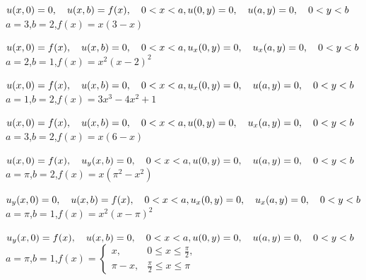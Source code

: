 \begin{exerciselist}

  \item\label{exer:12.3.17} \Cex $u(x,0)=0,\quad u(x,b)=f(x),\quad0<x<a,\\ u(0,y)=0,\quad u(a,y)=0,\quad0<y<b$ \\ $a=3$,\quad $b=2$,\quad $f(x)=x(3-x)$

  \item\label{exer:12.3.18} $u(x,0)=f(x),\quad u(x,b)=0,\quad0<x<a,\\ u_{x}(0,y)=0,\quad u_{x}(a,y)=0,\quad0<y<b$ \\ $a=2$,\quad $b=1$,\quad $f(x)=x^{2}(x-2)^{2}$

  \item\label{exer:12.3.19} $u(x,0)=f(x),\quad u(x,b)=0,\quad0<x<a,\\ u_{x}(0,y)=0,\quad u(a,y)=0,\quad0<y<b$ \\ $a=1$,\quad $b=2$,\quad $f(x)=3x^{3}-4x^{2}+1$

  \item\label{exer:12.3.20} $u(x,0)=f(x),\quad u(x,b)=0,\quad0<x<a,\\ u(0,y)=0,\quad u_{x}(a,y)=0,\quad0<y<b$ \\ $a=3$,\quad $b=2$,\quad $f(x)=x(6-x)$

  \item\label{exer:12.3.21} $u(x,0)=f(x),\quad u_{y}(x,b)=0,\quad0<x<a,\\ u(0,y)=0,\quad u(a,y)=0,\quad0<y<b$ \\ $a=\pi$,\quad $b=2$,\quad $f(x)=x(\pi^{2}-x^{2})$

  \item\label{exer:12.3.22} $u_{y}(x,0)=0,\quad u(x,b)=f(x),\quad0<x<a,\\ u_{x}(0,y)=0,\quad u_{x}(a,y)=0,\quad0<y<b$ \\ $a=\pi$,\quad $b=1$,\quad $f(x)=x^{2}(x-\pi)^{2}$

  \item\label{exer:12.3.23} \Cex $u_{y}(x,0)=f(x),\quad u(x,b)=0,\quad0<x<a,\\ u(0,y)=0,\quad u(a,y)=0,\quad0<y<b$ \\ $a=\pi$,\quad $b=1$,\quad $f(x)= \left\{
  \begin{array}{cl}
    x,     & 0\le x\le\frac{\pi}{2},  \\
    \pi-x, & \frac{\pi}{2}\le x\le\pi
  \end{array}\right.$


\end{exerciselist}
